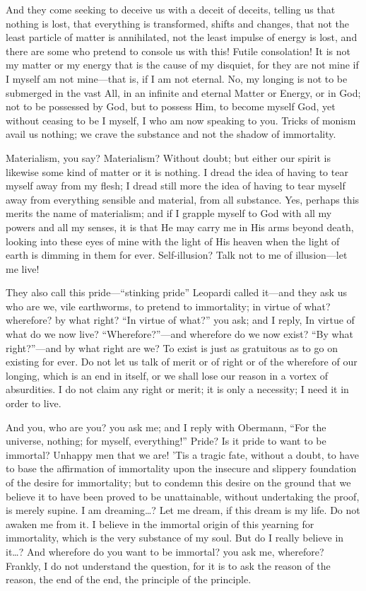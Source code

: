 And they come seeking to deceive us with a deceit of deceits, telling
us that nothing is lost, that everything is transformed, shifts and
changes, that not the least particle of matter is annihilated, not the
least impulse of energy is lost, and there are some who pretend to
console us with this! Futile consolation! It is not my matter or my
energy that is the cause of my disquiet, for they are not mine if I
myself am not mine---that is, if I am not eternal. No, my longing is
not to be submerged in the  vast All, in an infinite and
eternal Matter or Energy, or in God; not to be possessed by God, but
to possess Him, to become myself God, yet without ceasing to be I
myself, I who am now speaking to you. Tricks of monism avail us
nothing; we crave the substance and not the shadow of immortality.

Materialism, you say? Materialism? Without doubt; but either our
spirit is likewise some kind of matter or it is nothing. I dread the
idea of having to tear myself away from my flesh; I dread still more
the idea of having to tear myself away from everything sensible and
material, from all substance. Yes, perhaps this merits the name of
materialism; and if I grapple myself to God with all my powers and all
my senses, it is that He may carry me in His arms beyond death,
looking into these eyes of mine with the light of His heaven when the
light of earth is dimming in them for ever. Self-illusion? Talk not to
me of illusion---let me live!

They also call this pride---``stinking pride'' Leopardi called
it---and they ask us who are we, vile earthworms, to pretend to
immortality; in virtue of what? wherefore? by what right? ``In virtue
of what?'' you ask; and I reply, In virtue of what do we now live?
``Wherefore?''---and wherefore do we now exist? ``By what
right?''---and by what right are we? To exist is just as gratuitous as
to go on existing for ever. Do not let us talk of merit or of right or
of the wherefore of our longing, which is an end in itself, or we
shall lose our reason in a vortex of absurdities. I do not claim any
right or merit; it is only a necessity; I need it in order to live.

And you, who are you? you ask me; and I reply with Obermann, ``For the
universe, nothing; for myself, everything!'' Pride? Is it pride to
want to be immortal? Unhappy men that we are! 'Tis a tragic fate,
without a doubt, to have to base the affirmation of immortality upon
the insecure and slippery foundation of the desire for immortality;
but to condemn this  desire on the ground that we believe it
to have been proved to be unattainable, without undertaking the proof,
is merely supine. I am dreaming\ldots ? Let me dream, if this dream is
my life. Do not awaken me from it. I believe in the immortal origin of
this yearning for immortality, which is the very substance of my soul.
But do I really believe in it\ldots ? And wherefore do you want to be
immortal? you ask me, wherefore? Frankly, I do not understand the
question, for it is to ask the reason of the reason, the end of the
end, the principle of the principle.

